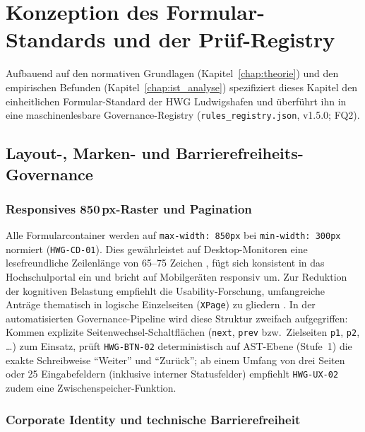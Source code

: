 \chapter{Konzeption des Formular-Standards und der Prüf-Registry}
\label{chap:konzeption}

Aufbauend auf den normativen Grundlagen (Kapitel~\ref{chap:theorie}) und den empirischen Befunden (Kapitel~\ref{chap:ist_analyse}) spezifiziert dieses Kapitel den einheitlichen Formular-Standard der HWG Ludwigshafen und überführt ihn in eine maschinenlesbare Governance-Registry (\texttt{rules\_registry.json}, v1.5.0; FQ2).

\section{Layout-, Marken- und Barrierefreiheits-Governance}
\label{sec:architektur}

\subsection{Responsives \texorpdfstring{850\,px}{850 px}-Raster und Pagination}
\label{subsec:breiten_norm}

Alle Formularcontainer werden auf \texttt{max-width: 850px} bei \texttt{min-width: 300px} normiert (\texttt{HWG-CD-01}). Dies gewährleistet auf Desktop-Monitoren eine lesefreundliche Zeilenlänge von 65--75 Zeichen \parencite{wroblewski2008web}, fügt sich konsistent in das Hochschulportal ein und bricht auf Mobilgeräten responsiv um. Zur Reduktion der kognitiven Belastung empfiehlt die Usability-Forschung, umfangreiche Anträge thematisch in logische Einzelseiten (\texttt{XPage}) zu gliedern \parencite{bargas2010usable, seckler2014validation}. In der automatisierten Governance-Pipeline wird diese Struktur zweifach aufgegriffen: Kommen explizite Seitenwechsel-Schaltflächen (\texttt{next}, \texttt{prev} bzw.\ Zielseiten \texttt{p1}, \texttt{p2}, \dots) zum Einsatz, prüft \texttt{HWG-BTN-02} deterministisch auf AST-Ebene (Stufe~1) die exakte Schreibweise \enquote{Weiter} und \enquote{Zurück}; ab einem Umfang von drei Seiten oder 25 Eingabefeldern (inklusive interner Statusfelder) empfiehlt \texttt{HWG-UX-02} zudem eine Zwischenspeicher-Funktion.

\subsection{Corporate Identity und technische Barrierefreiheit}
\label{subsec:ci_header_footer}

